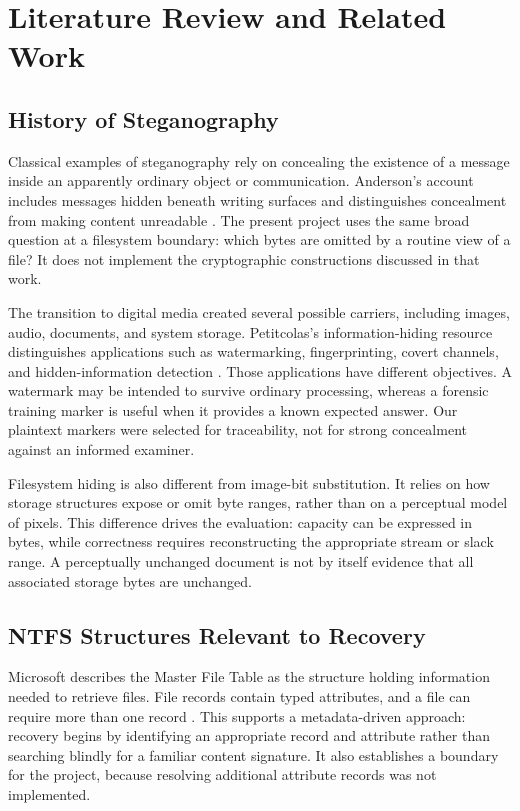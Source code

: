 \chapter{Literature Review and Related Work}
\section{History of Steganography}
Classical examples of steganography rely on concealing the existence of a
message inside an apparently ordinary object or communication. Anderson's
account includes messages hidden beneath writing surfaces and distinguishes
concealment from making content unreadable \cite{anderson}. The present
project uses the same broad question at a filesystem boundary: which bytes
are omitted by a routine view of a file? It does not implement the
cryptographic constructions discussed in that work.

The transition to digital media created several possible carriers, including
images, audio, documents, and system storage. Petitcolas's information-hiding
resource distinguishes applications such as watermarking, fingerprinting,
covert channels, and hidden-information detection \cite{petitcolas}.
Those applications have different objectives. A watermark may be intended
to survive ordinary processing, whereas a forensic training marker is useful
when it provides a known expected answer. Our plaintext markers were selected
for traceability, not for strong concealment against an informed examiner.

Filesystem hiding is also different from image-bit substitution. It relies
on how storage structures expose or omit byte ranges, rather than on a
perceptual model of pixels. This difference drives the evaluation: capacity
can be expressed in bytes, while correctness requires reconstructing the
appropriate stream or slack range. A perceptually unchanged document is not
by itself evidence that all associated storage bytes are unchanged.

\section{NTFS Structures Relevant to Recovery}
Microsoft describes the Master File Table as the structure holding
information needed to retrieve files. File records contain typed attributes,
and a file can require more than one record \cite{mft}. This supports a
metadata-driven approach: recovery begins by identifying an appropriate
record and attribute rather than searching blindly for a familiar content
signature. It also establishes a boundary for the project, because resolving
additional attribute records was not implemented.

